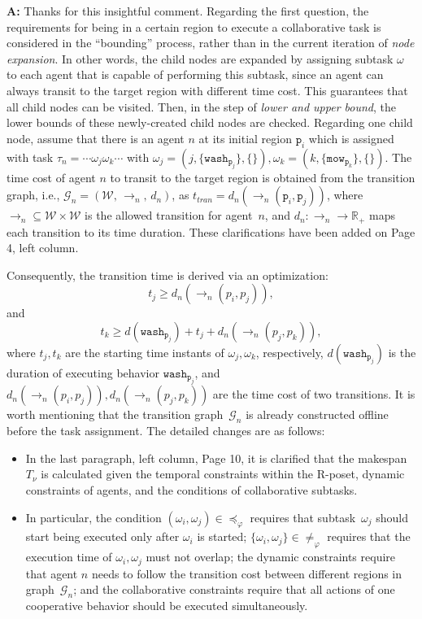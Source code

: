 \documentclass[10pt]{article}
\begin{document}
\textbf{A:} Thanks for this insightful comment.
Regarding the first question,
the requirements for being in a certain region to execute a
collaborative task is considered in the ``bounding'' process,
rather than in the current iteration
of \emph{node expansion}.
In other words, the child nodes are expanded by assigning subtask $\omega$ to
each agent that is capable of performing this subtask,
since an agent can always transit to the target region with different time cost.
This guarantees that all child nodes can be visited.
Then, in the step of \emph{lower and upper bound},
the lower bounds of these newly-created child nodes are checked.
Regarding one child node, assume that there is an agent $n$ at its initial region $\texttt{p}_{i}$
which is assigned with task $\tau_n=\cdots\omega_j\omega_k\cdots$ with
$\omega_j=(j, \{\texttt{wash}_{\texttt{p}_{j}}\}, \{\}), \omega_k=(k, \{\texttt{mow}_{\texttt{p}_k}\},\{\})$.
The time cost of agent $n$ to transit to the target region is obtained from the transition graph, i.e., $\mathcal{G}_n=({\mathcal{W}},\,\rightarrow_n,\,d_n)$, as $t_{tran}=d_n(\rightarrow_n(\texttt{p}_{i},\texttt{p}_{j}))$, where $\rightarrow_n\subseteq {\mathcal{W}}\times {\mathcal{W}}$
is the allowed transition for agent~$n$,
and $d_n:\rightarrow_n \rightarrow \mathbb{R}_{+}$ maps each transition to its time duration.
These clarifications have been added on Page 4, left column.

Consequently, the transition time is derived via an optimization:
$$t_j\geq d_n(\rightarrow_n(p_i,p_j)),$$
and $$t_k\geq d(\texttt{wash}_{\texttt{p}_{j}})+t_j+d_n(\rightarrow_n(p_j,p_k)) ,$$
where $t_j,t_k$ are the starting time instants of $\omega_j,\omega_k$, respectively,
$d(\texttt{wash}_{\texttt{p}_{j}})$ is the duration of executing behavior $\texttt{wash}_{\texttt{p}_{j}}$,
and $d_n(\rightarrow_n(p_i,p_j)), d_n(\rightarrow_n(p_j,p_k))$ are the time cost of two transitions.
It is worth mentioning that the transition graph~$\mathcal{G}_n$ is already
constructed offline before the task assignment.
The detailed changes are as follows:
\begin{itemize}
\item In the last paragraph, left column, Page 10, it is clarified that
  the makespan $T_\nu$ is calculated given
  the temporal constraints within the R-poset, dynamic constraints of agents, and the conditions of collaborative subtasks.

\item In particular, the condition $(\omega_i,\omega_j)\in\preceq_\varphi$ requires that subtask~$\omega_j$
  should start being executed only after $\omega_i$ is started;
  $\{\omega_i,\omega_j\}\in\neq_\varphi$ requires that the execution time of $\omega_i, \omega_j$ must not overlap;
  the dynamic constraints require that agent $n$ needs to follow the transition
  cost between different regions in graph~$\mathcal{G}_n$;
  and the collaborative constraints require that all actions of
  one cooperative behavior should be executed simultaneously.
\end{itemize}
\end{document}
